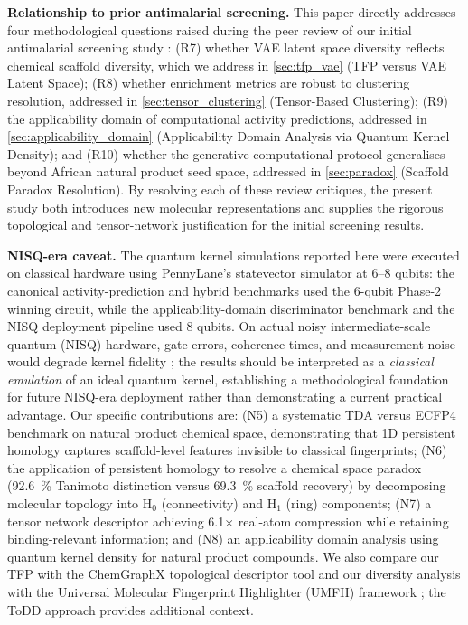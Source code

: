\documentclass[11pt,a4paper]{article}
\begin{document}
\noindent\textbf{Relationship to prior antimalarial screening.} This paper directly addresses four methodological questions raised during the peer review of our initial antimalarial screening study \citep{temgoua2026antimalarial}: (R7) whether VAE latent space diversity reflects chemical scaffold diversity, which we address in \cref{sec:tfp_vae} (TFP versus VAE Latent Space); (R8) whether enrichment metrics are robust to clustering resolution, addressed in \cref{sec:tensor_clustering} (Tensor-Based Clustering); (R9) the applicability domain of computational activity predictions, addressed in \cref{sec:applicability_domain} (Applicability Domain Analysis via Quantum Kernel Density); and (R10) whether the generative computational protocol generalises beyond African natural product seed space, addressed in \cref{sec:paradox} (Scaffold Paradox Resolution). By resolving each of these review critiques, the present study both introduces new molecular representations and supplies the rigorous topological and tensor-network justification for the initial screening results.

\noindent\textbf{NISQ-era caveat.} The quantum kernel simulations reported here were executed on classical hardware using PennyLane's statevector simulator at 6--8 qubits: the canonical activity-prediction and hybrid benchmarks used the 6-qubit Phase-2 winning circuit, while the applicability-domain discriminator benchmark and the NISQ deployment pipeline used 8 qubits. On actual noisy intermediate-scale quantum (NISQ) hardware, gate errors, coherence times, and measurement noise would degrade kernel fidelity \citep{preskill2018nisq}; the results should be interpreted as a \emph{classical emulation} of an ideal quantum kernel, establishing a methodological foundation for future NISQ-era deployment rather than demonstrating a current practical advantage. Our specific contributions are: (N5) a systematic TDA versus ECFP4 benchmark on natural product chemical space, demonstrating that 1D persistent homology captures scaffold-level features invisible to classical fingerprints; (N6) the application of persistent homology to resolve a chemical space paradox (\qty{92.6}{\percent} Tanimoto distinction versus \qty{69.3}{\percent} scaffold recovery) by decomposing molecular topology into H$_0$ (connectivity) and H$_1$ (ring) components; (N7) a tensor network descriptor achieving \num{6.1}$\times$ real-atom compression while retaining binding-relevant information; and (N8) an applicability domain analysis using quantum kernel density for natural product compounds. We also compare our TFP with the ChemGraphX topological descriptor tool \citep{chemgraphx_2026} and our diversity analysis with the Universal Molecular Fingerprint Highlighter (UMFH) framework \citep{umfh_2026}; the ToDD approach \citep{todd_2023} provides additional context.
\end{document}
